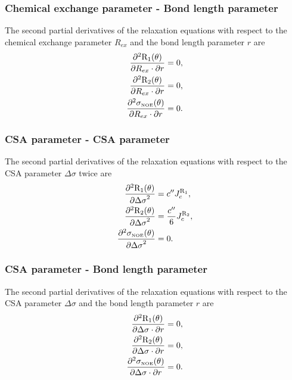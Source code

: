 \subsubsection{Chemical exchange parameter - Bond length parameter}

The second partial derivatives of the relaxation equations with respect to the chemical exchange parameter $R_{ex}$ and the bond length parameter $r$ are
\begin{align}
    \frac{\partial^2 \mathrm{R}_1(\theta)}{\partial R_{ex} \cdot \partial r} &= 0,           \label{eq: Ri': d2R1/dRex.dr} \\
    \frac{\partial^2 \mathrm{R}_2(\theta)}{\partial R_{ex} \cdot \partial r} &= 0,           \label{eq: Ri': d2R2/dRex.dr} \\
    \frac{\partial^2 \sigma_{\scriptscriptstyle \mathrm{NOE}}(\theta)}{\partial R_{ex} \cdot \partial r} &= 0.    \label{eq: Ri': d2sigmaNOE/dRex.dr}
\end{align}


\subsubsection{CSA parameter - CSA parameter}

The second partial derivatives of the relaxation equations with respect to the CSA parameter $\Delta\sigma$ twice are
\begin{align}
    \frac{\partial^2 \mathrm{R}_1(\theta)}{{\partial \Delta\sigma}^2} &= c'' J_c^{\mathrm{R}_1},              \label{eq: Ri': d2R1/dCSA2} \\
    \frac{\partial^2 \mathrm{R}_2(\theta)}{{\partial \Delta\sigma}^2} &= \frac{c''}{6} J_c^{\mathrm{R}_2},    \label{eq: Ri': d2R2/dCSA2} \\
    \frac{\partial^2 \sigma_{\scriptscriptstyle \mathrm{NOE}}(\theta)}{{\partial \Delta\sigma}^2} &= 0.                   \label{eq: Ri': d2sigmaNOE/dCSA2}
\end{align}


\subsubsection{CSA parameter - Bond length parameter}

The second partial derivatives of the relaxation equations with respect to the CSA parameter $\Delta\sigma$ and the bond length parameter $r$ are
\begin{align}
    \frac{\partial^2 \mathrm{R}_1(\theta)}{\partial \Delta\sigma \cdot \partial r} &= 0,         \label{eq: Ri': d2R1/dCSA.dr} \\
    \frac{\partial^2 \mathrm{R}_2(\theta)}{\partial \Delta\sigma \cdot \partial r} &= 0,         \label{eq: Ri': d2R2/dCSA.dr} \\
    \frac{\partial^2 \sigma_{\scriptscriptstyle \mathrm{NOE}}(\theta)}{\partial \Delta\sigma \cdot \partial r} &= 0.  \label{eq: Ri': d2sigmaNOE/dCSA.dr}
\end{align}


